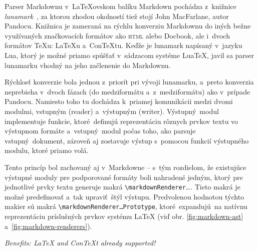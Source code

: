 \documentclass[
  digital,     %
  oneside,     %
  nosansbold,  %
  nocolorbold, %
  lof,         %
  lot,         %
]{fithesis4}
\let\oldlooseness=\looseness
\newcommand{\macro}[1]{\texttt{\textbackslash{}{#1}}}
\begin{document}
Parser Markdownu v~\LaTeX{}ovskom balíku Markdown pochádza z~knižnice \emph{lunamark}~\cite{lunamark}, za ktorou zhodou okolností tiež stojí John MacFarlane, autor Pandocu. Knižnica je zameraná na rýchlu konverziu Markdownu do iných bežne využívaných značkovacích formátov ako \textsc{html} alebo Docbook, ale i~dvoch formátov \TeX{}u: \LaTeX{}u a~Con\TeX{}tu. Keďže je lunamark napísaný v~jazyku Lua, ktorý je možné priamo spúšťať v~sádzacom systéme Lua\TeX{}, javil sa parser lunamarku vhodný na jeho začlenenie do Markdownu.

Rýchlosť konverzie bola jednou z~priorít pri vývoji lunamarku, a~preto konverzia neprebieha v~dvoch fázach (do medziformátu a~z~medziformátu) ako v~prípade Pandocu. Namiesto toho tu dochádza k~priamej komunikácii medzi dvomi modulmi, vstupným (reader) a~výstupným (writer). Výstupný modul implementuje funkcie, ktoré definujú reprezentáciu rôznych prvkov textu vo výstupnom formáte a~vstupný modul počas toho, ako parsuje vstupný dokument, zároveň aj zostavuje výstup s~pomocou funkcií výstupného modulu, ktoré priamo volá.

Tento princíp bol zachovaný aj v~Markdowne -- s~tým rozdielom, že existujúce výstupné moduly pre podporované formáty boli nahradené jedným, ktorý pre jednotlivé prvky textu generuje makrá \macro{markdownRenderer}\ldots. Tieto makrá je možné predefinovať a~tak upraviť štýl výstupu. Predvolenou hodnotou týchto makier sú makrá \macro{markdownRenderer\textrm{\ldots}Prototype}, ktoré expandujú na natívnu reprezentáciu príslušných prvkov systému \LaTeX{} (viď obr. \ref{fig:markdown-ast} a~\ref{fig:markdown-renderers}).
\oldlooseness=-1

\emph{Benefits: \LaTeX{} and Con\TeX{}t already supported!}
\end{document}
